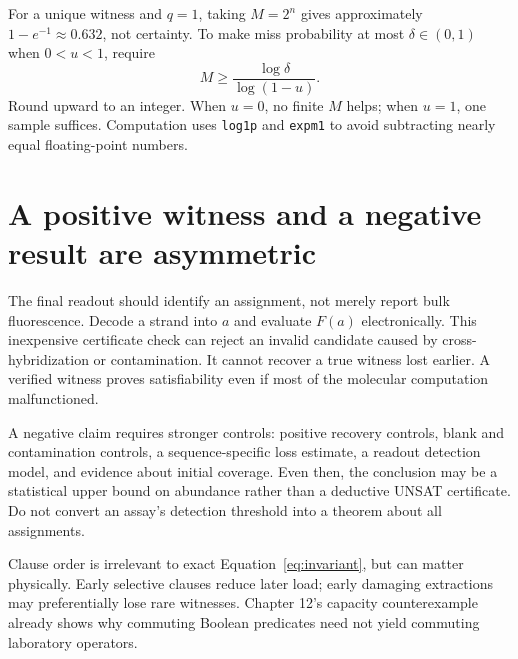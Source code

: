 
For a unique witness and $q=1$, taking $M=2^n$ gives approximately
$1-e^{-1}\approx0.632$, not certainty. To make miss probability at most
$\delta\in(0,1)$ when $0<u<1$, require
\begin{equation}
 M\geq\frac{\log\delta}{\log(1-u)}.
\end{equation}
Round upward to an integer. When $u=0$, no finite $M$ helps; when $u=1$,
one sample suffices. Computation uses \texttt{log1p} and \texttt{expm1}
to avoid subtracting nearly equal floating-point numbers.

\section{A positive witness and a negative result are asymmetric}
The final readout should identify an assignment, not merely report bulk
fluorescence. Decode a strand into $a$ and evaluate $F(a)$ electronically.
This inexpensive certificate check can reject an invalid candidate caused
by cross-hybridization or contamination. It cannot recover a true witness
lost earlier. A verified witness proves satisfiability even if most of the
molecular computation malfunctioned.


A negative claim requires stronger controls: positive recovery controls,
blank and contamination controls, a sequence-specific loss estimate,
a readout detection model, and evidence about initial coverage. Even then,
the conclusion may be a statistical upper bound on abundance rather than
a deductive UNSAT certificate. Do not convert an assay's detection threshold
into a theorem about all assignments.

Clause order is irrelevant to exact Equation~\ref{eq:invariant}, but can
matter physically. Early selective clauses reduce later load; early
damaging extractions may preferentially lose rare witnesses. Chapter 12's
capacity counterexample already shows why commuting Boolean predicates
need not yield commuting laboratory operators.

